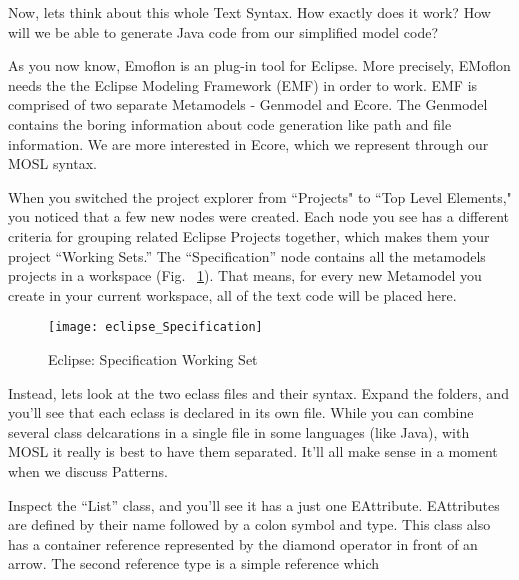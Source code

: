 \newpage
\texHeader

Now, lets think about this whole Text Syntax. How exactly does it work? How will we be able to generate Java code from our simplified model code?

As you now know, Emoflon is an plug-in tool for Eclipse. More precisely, EMoflon needs the the Eclipse Modeling Framework (EMF) in order to work. EMF is comprised of two separate Metamodels - Genmodel and Ecore. The Genmodel contains the boring information about code generation like path and file information. 
We are more interested in Ecore, which we represent through our MOSL syntax. 

When you switched the project explorer from ``Projects" to ``Top Level Elements," you noticed that a few new nodes were created. Each node you see has a different criteria for grouping related Eclipse Projects together, which makes them your project ``Working Sets.'' The ``Specification'' node contains all the metamodels projects in a workspace (Fig. ~\ref{fig_modelSpecification}). That means, for every new Metamodel you create in your current workspace, all of the text code will be placed here. 

 \begin{figure}[htbp]
  \centering
  \texttt{[image: eclipse\_Specification]}
  \caption{Eclipse: Specification Working Set}
  \label{fig_modelSpecification}
\end{figure}
  

Instead, lets look at the two eclass files and their syntax. Expand the folders, and you'll see that each eclass is declared in its own file. While you can combine several class delcarations in a single file in some languages (like Java), with MOSL it really is best to have them separated. It'll all make sense in a moment when we discuss Patterns.

Inspect the ``List'' class, and you'll see it has a just one EAttribute. EAttributes are defined by their name followed by a colon symbol and type.
This class also has a container reference represented by the diamond operator in front of an arrow.
The second reference type is a simple reference which